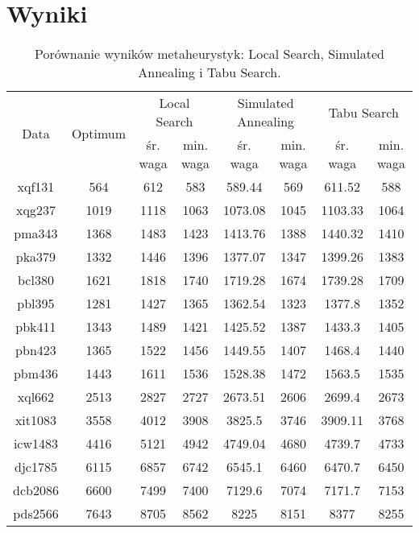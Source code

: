 \documentclass{article}
\begin{document}
\section{Wyniki}
\begin{table}[h!]
    \centering
    \begin{tabular}{|c|c|c|c|c|c|c|c|}
        \hline
        \multirow{2}{*}{Data} & \multirow{2}{*}{Optimum} & \multicolumn{2}{|c|}{Local Search} & \multicolumn{2}{|c|}{Simulated Annealing}  & \multicolumn{2}{|c|}{Tabu Search}  \\
        \cline{3-8}
        & & śr. waga & min. waga & śr. waga & min. waga & śr. waga & min. waga \\
        \hline
        xqf131 & 564 & 612 & 583 & 589.44 & 569 & 611.52 & 588 \\
        \hline
        xqg237 & 1019 & 1118 & 1063 & 1073.08 & 1045 & 1103.33 & 1064 \\
        \hline
        pma343 & 1368 & 1483 & 1423 & 1413.76 & 1388 & 1440.32 & 1410 \\
        \hline
        pka379 & 1332 & 1446 & 1396 & 1377.07 & 1347 & 1399.26 & 1383 \\
        \hline
        bcl380 & 1621 & 1818 & 1740 & 1719.28 & 1674 & 1739.28 & 1709 \\
        \hline
        pbl395 & 1281 & 1427 & 1365 & 1362.54 & 1323 & 1377.8 & 1352 \\
        \hline
        pbk411 & 1343 & 1489 & 1421 & 1425.52 & 1387 & 1433.3 & 1405 \\
        \hline
        pbn423 & 1365 & 1522 & 1456 & 1449.55 & 1407 & 1468.4 & 1440 \\
        \hline
        pbm436 & 1443 & 1611 & 1536 & 1528.38 & 1472 & 1563.5 & 1535 \\
        \hline
        xql662 & 2513 & 2827 & 2727 & 2673.51 & 2606 & 2699.4 & 2673 \\
        \hline
        xit1083 & 3558 & 4012 & 3908 & 3825.5 & 3746 & 3909.11 & 3768 \\
        \hline
        icw1483 & 4416 & 5121 & 4942 & 4749.04 & 4680 & 4739.7 & 4733 \\
        \hline
        djc1785 & 6115 & 6857 & 6742 & 6545.1 & 6460 & 6470.7 & 6450 \\
        \hline
        dcb2086 & 6600 & 7499 & 7400 & 7129.6 & 7074 & 7171.7 & 7153 \\
        \hline
        pds2566 & 7643 & 8705 & 8562 & 8225 & 8151 & 8377 & 8255 \\
        \hline
    \end{tabular}
    \caption{Porównanie wyników metaheurystyk: Local Search, Simulated Annealing i Tabu Search.}
\end{table}
\end{document}
